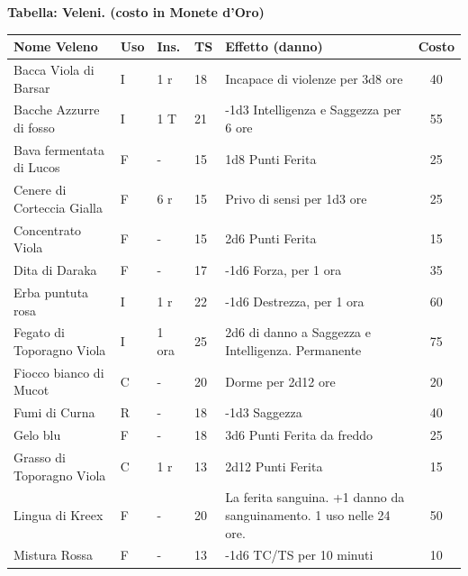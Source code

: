 \vspace{2cm}

\textbf{Tabella: Veleni. (costo in Monete d'Oro)}\label{tabellaveleni}

\medskip

\noindent\begin{tabularx}{1\textwidth}{m{4.8cm}lllm{6.5cm}c}
	\toprule
	\textbf{Nome Veleno} & \textbf{Uso} & \textbf{Ins.} & \textbf{TS} & \textbf{Effetto (danno)} & \textbf{Costo}\\
	\midrule
	Bacca Viola di Barsar\index{Bacca Viola di Barsar}& I& 1 r& 18& Incapace di violenze per 3d8 ore& 40 \\
	\midrule
	Bacche Azzurre di fosso \index{Bacche Azzurre di fosso}& I& 1 T& 21& -1d3 Intelligenza e Saggezza per 6 ore& 55\\
	\midrule
	Bava fermentata di Lucos \index{Bava fermentata di Lucos}\label{bavadilucos}\hypertarget{bavadilucos}{}& F& - & 15& 1d8 Punti Ferita& 25\\
	\midrule
	Cenere di Corteccia Gialla \index{Cenere di Corteccia Gialla} & F& 6 r& 15& Privo di sensi per 1d3 ore& 25\\
	\midrule
	Concentrato Viola \index{Concentrato Viola} & F& -& 15& 2d6 Punti Ferita & 15\\
	\midrule
	Dita di Daraka\index{Dita di Daraka} & F& - & 17& -1d6 Forza, per 1 ora & 35\\
	\midrule
	Erba puntuta rosa \index{Erba puntuta rosa}& I& 1 r& 22& -1d6 Destrezza, per 1 ora& 60\\
	\midrule
	Fegato di Toporagno Viola \index{Fegato di Toporagno Viola} & I& 1 ora& 25& 2d6 di danno a Saggezza e Intelligenza. Permanente & 75 \\
	\midrule
	Fiocco bianco di Mucot \index{Fiocco bianco di Mucot}& C& - & 20& Dorme per 2d12 ore& 20\\
	\midrule
	Fumi di Curna\index{Fumi di Curna} & R& - & 18& -1d3 Saggezza & 40\\
	\midrule
	Gelo blu \index{Gelo blu} & F& -& 18& 3d6 Punti Ferita da freddo& 25\\
	\midrule
	Grasso di Toporagno Viola \index{Grasso di Toporagno Viola} & C& 1 r& 13& 2d12 Punti Ferita & 15\\
	\midrule
	Lingua di Kreex \index{Lingua di Kreex} & F& - & 20& La ferita sanguina. +1 danno da sanguinamento. 1 uso nelle 24 ore. & 50 \\
	\midrule
	Mistura Rossa \index{Mistura Rossa} & F& -& 13& -1d6 TC/TS per 10 minuti & 10\\

\end{tabularx}
